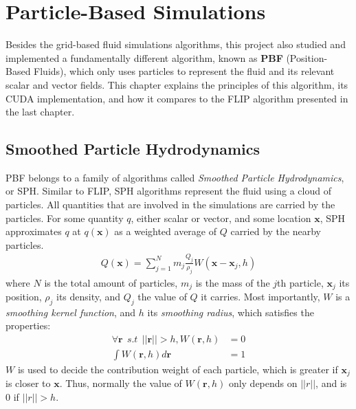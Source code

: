 \chapter{Particle-Based Simulations}
\label{chapter particle}



Besides the grid-based fluid simulations algorithms, this project also studied and implemented a fundamentally different algorithm, known as \textbf{PBF} (Position-Based Fluids), which only uses particles to represent the fluid and its relevant scalar and vector fields. This chapter explains the principles of this algorithm, its CUDA implementation, and how it compares to the FLIP algorithm presented in the last chapter.

\section{Smoothed Particle Hydrodynamics}
PBF belongs to a family of algorithms called \textit{Smoothed Particle Hydrodynamics}, or SPH. Similar to FLIP, SPH algorithms represent the fluid using a cloud of particles. All quantities that are involved in the simulations are carried by the particles. For some quantity $q$, either scalar or vector, and some location $\textbf{x}$, SPH approximates $q$ at $q(\textbf{x})$ as a weighted average of $Q$ carried by the nearby particles.
\begin{equation}
    \label{eqn SPH basic}
    \begin{aligned}
        Q(\textbf{x}) = \sum_{j=1}^N m_j \frac{Q_j}{\rho_j} W(\textbf{x}-\textbf{x}_j,h)
    \end{aligned}
\end{equation}
where $N$ is the total amount of particles, $m_j$ is the mass of the $j$th particle, $\textbf{x}_j$ its position, $\rho_j$ its density, and $Q_j$ the value of $Q$ it carries. Most importantly, $W$ is a \textit{smoothing kernel function}, and $h$ its \textit{smoothing radius}, which satisfies the properties:
\begin{equation}
    \begin{aligned}
        \forall\textbf{r}~~s.t~~||\textbf{r}||>h, W(\textbf{r},h) &= 0\\
        \int W(\textbf{r},h) d\textbf{r} &= 1
    \end{aligned}
\end{equation}
$W$ is used to decide the contribution weight of each particle, which is greater if $\textbf{x}_j$ is closer to $\textbf{x}$. Thus, normally the value of $W(\textbf{r},h)$ only depends on $||r||$, and is $0$ if $||r||>h$.


